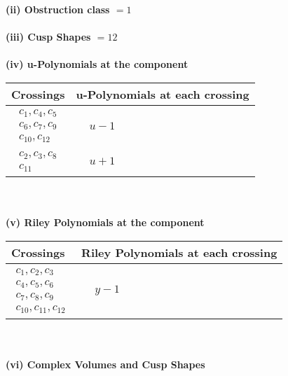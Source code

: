 \documentclass[1p]{elsarticle_modified}
\theoremstyle{definition}
\begin{document}
\flushleft \textbf{(ii) Obstruction class $= 1$}\\~\\
\flushleft \textbf{(iii) Cusp Shapes $= 12$}\\~\\
\newpage\renewcommand{\arraystretch}{1}
\flushleft \textbf{(iv) u-Polynomials at the component}\newline \\
\begin{tabular}{m{50pt}|m{274pt}}
Crossings & \hspace{64pt}u-Polynomials at each crossing \\
\hline $$\begin{aligned}c_{1},c_{4},c_{5}\\c_{6},c_{7},c_{9}\\c_{10},c_{12}\end{aligned}$$&$\begin{aligned}
&u-1
\end{aligned}$\\
\hline $$\begin{aligned}c_{2},c_{3},c_{8}\\c_{11}\end{aligned}$$&$\begin{aligned}
&u+1
\end{aligned}$\\
\hline
\end{tabular}\\~\\
\newpage\renewcommand{\arraystretch}{1}
\flushleft \textbf{(v) Riley Polynomials at the component}\newline \\
\begin{tabular}{m{50pt}|m{274pt}}
Crossings & \hspace{64pt}Riley Polynomials at each crossing \\
\hline $$\begin{aligned}c_{1},c_{2},c_{3}\\c_{4},c_{5},c_{6}\\c_{7},c_{8},c_{9}\\c_{10},c_{11},c_{12}\end{aligned}$$&$\begin{aligned}
&y-1
\end{aligned}$\\
\hline
\end{tabular}\\~\\
\newpage\flushleft \textbf{(vi) Complex Volumes and Cusp Shapes}
\end{document}
